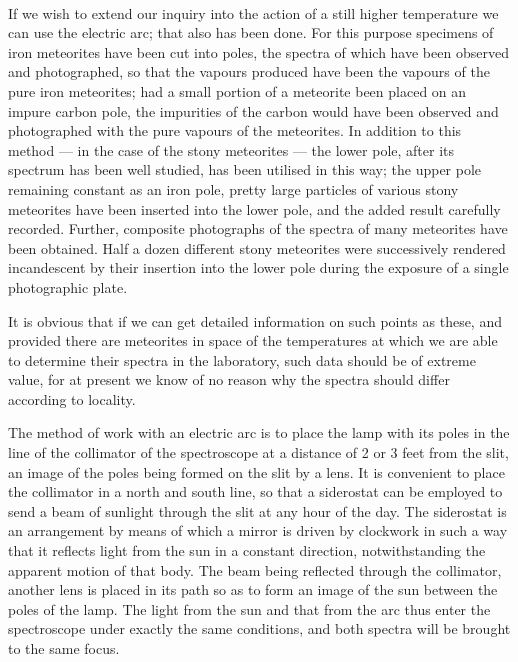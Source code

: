 \documentclass[a4paper, 12pt, oneside, polutonikogreek, english]{article}
\begin{document}
\paragraph{}
If we wish to extend our inquiry into the action of a still higher temperature we can use the electric arc; that also has been done. For this purpose specimens of iron meteorites have been cut into poles, the spectra of which have been observed and photographed, so that the vapours produced have been the vapours of the pure iron meteorites; had a small portion of a meteorite been placed on an impure carbon pole, the impurities of the carbon would have been observed and photographed with the pure vapours of the meteorites. In addition to this method --- in the case of the stony meteorites --- the lower pole, after its spectrum has been well studied, has been utilised in this way; the upper pole remaining constant as an iron pole, pretty large particles of various stony meteorites have been inserted into the lower pole, and the added result carefully recorded. Further, composite photographs of the spectra of many meteorites have been obtained. Half a dozen different stony meteorites were successively rendered incandescent by their insertion into the lower pole during the exposure of a single photographic plate.

It is obvious that if we can get detailed information on such points as these, and provided there are meteorites in space of the temperatures at which we are able to determine their spectra in the laboratory, such data should be of extreme value, for at present we know of no reason why the spectra should differ according to locality.

The method of work with an electric arc is to place the lamp with its poles in the line of the collimator of the spectroscope at a distance of 2 or 3 feet from the slit, an image of the poles being formed on the slit by a lens. It is convenient to place the collimator in a north and south line, so that a siderostat can be employed to send a beam of sunlight through the slit at any hour of the day. The siderostat is an arrangement by means of which a mirror is driven by clockwork in such a way that it reflects light from the sun in a constant direction, notwithstanding the apparent motion of that body. The beam being reflected through the collimator, another lens is placed in its path so as to form an image of the sun between the poles of the lamp. The light from the sun and that from the arc thus enter the spectroscope under exactly the same conditions, and both spectra will be brought to the same focus.
\end{document}
